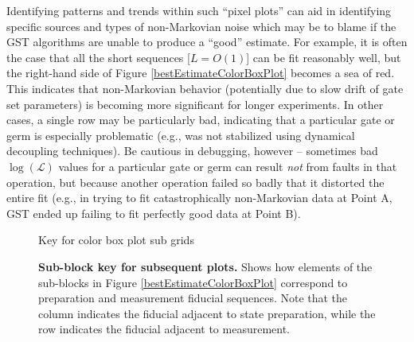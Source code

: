 \documentclass{article}[11pt]
\newcommand{\putfield}[2]{#2}
\begin{document}
{Identifying patterns and trends within such ``pixel plots'' can aid in identifying specific sources and types of non-Markovian noise which may be to blame if the GST algorithms are unable to produce a ``good'' estimate.  For example, it is often the case that all the short sequences [$L = O(1)$] can be fit reasonably well, but the right-hand side of Figure \ref{bestEstimateColorBoxPlot} becomes a sea of red.  This indicates that non-Markovian behavior (potentially due to slow drift of gate set parameters) is becoming more significant for longer experiments.  In other cases, a single row may be particularly bad, indicating that a particular gate or germ is especially problematic (e.g., was not stabilized using dynamical decoupling techniques).  Be cautious in debugging, however -- sometimes bad $\log(\mathcal{L})$ values for a particular gate or germ can result \emph{not} from faults in that operation, but because another operation failed so badly that it distorted the entire fit (e.g., in trying to fit catastrophically non-Markovian data at Point A, GST ended up failing to fit perfectly good data at Point B).




\begin{figure}
\begin{center}
\putfield{colorBoxPlotKeyPlot}{Key for color box plot sub grids}
\caption{\putfield{tt_colorBoxPlotKeyPlot}{}\textbf{Sub-block key for subsequent plots.} Shows how elements of the sub-blocks in Figure \ref{bestEstimateColorBoxPlot} correspond to preparation and measurement fiducial sequences.  Note that the column indicates the fiducial adjacent to state preparation, while the row indicates the fiducial adjacent to measurement.\label{colorBoxPlotKeyPlot}}
\end{center}
\end{figure}


}
\end{document}
